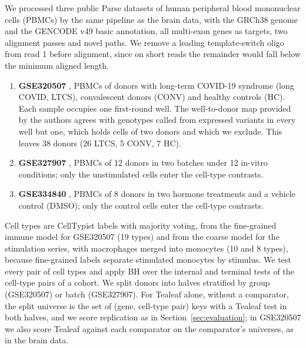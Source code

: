 \documentclass[11pt]{article}
\begin{document}
We processed three public Parse datasets of human peripheral blood mononuclear cells (PBMCs) by the same pipeline as the brain data, with the GRCh38 genome and the GENCODE v49 basic annotation, all multi-exon genes as targets, two alignment passes and novel paths. We remove a leading template-switch oligo from read 1 before alignment, since on short reads the remainder would fall below the minimum aligned length.
\begin{enumerate}[leftmargin=*]
  \item \textbf{GSE320507} \cite{ray2026}, PBMCs of donors with long-term COVID-19 syndrome (long COVID, LTCS), convalescent donors (CONV) and healthy controls (HC). Each sample occupies one first-round well. The well-to-donor map provided by the authors agrees with genotypes called from expressed variants in every well but one, which holds cells of two donors and which we exclude. This leaves 38 donors (26 LTCS, 5 CONV, 7 HC).
  \item \textbf{GSE327907} \cite{wood2026}, PBMCs of 12 donors in two batches under 12 in-vitro conditions; only the unstimulated cells enter the cell-type contrasts.
  \item \textbf{GSE334840} \cite{benavides2026}, PBMCs of 8 donors in two hormone treatments and a vehicle control (DMSO); only the control cells enter the cell-type contrasts.
\end{enumerate}
Cell types are CellTypist \cite{dominguezconde2022} labels with majority voting, from the fine-grained immune model for GSE320507 (19 types) and from the coarse model for the stimulation series, with macrophages merged into monocytes (10 and 8 types), because fine-grained labels separate stimulated monocytes by stimulus. We test every pair of cell types and apply BH over the internal and terminal tests of the cell-type pairs of a cohort. We split donors into halves stratified by group (GSE320507) or batch (GSE327907). For Tealeaf alone, without a comparator, the split universe is the set of (gene, cell-type pair) keys with a Tealeaf test in both halves, and we score replication as in Section~\ref{sec:evaluation}; in GSE320507 we also score Tealeaf against each comparator on the comparator's universes, as in the brain data.
\end{document}
